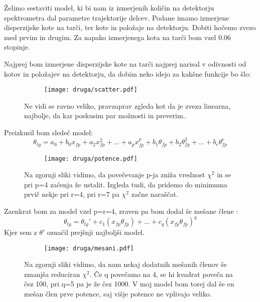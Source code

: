 \documentclass{article}
\begin{document}
Želimo sestaviti model, ki bi nam iz izmerjenih količin na detektorju spektrometra dal parametre trajektorije delcev.
Podane imamo izmerjene disperzijske kote na tarči, ter kote in položaje na detektorju. Dobiti hočemo zvezo med prvim in drugim.
Za napako izmerjenega kota na tarči bom vzel 0.06 stopinje.

Najprej bom izmerjene disperzijske kote na tarči najprej narisal v odivnosti od kotov in položajev na detektorju, da dobim neko idejo za kakšne funkcije bo šlo:

\begin{figure}[H]
\begin{subfigure}{\textwidth}
\texttt{[image: druga/scatter.pdf]}
\end{subfigure}
\caption*{Ne vidi se ravno veliko, pravzaprav zgleda kot da je zveza linearna, najbolje, da kar poskusim par možnosti in preverim..}
\end{figure}

Preizkusil bom sledeč model:
\begin{equation*}
\theta_{tg} =  a_0 + b_0 x_{fp} + a_2 x_{fp}^2 + ... + a_p x_{fp}^p + b_1 \theta_{fp} + b_2 \theta_{fp}^2 + ... + b_r \theta_{fp}^r
\end{equation*}

\begin{figure}[H]
\begin{subfigure}{\textwidth}
\texttt{[image: druga/potence.pdf]}
\end{subfigure}
\caption*{Na zgornji sliki vidimo, da povečevanje p-ja zniža vrednost $\chi^2$ in se pri p=4 začenja že ustalit. Izgleda tudi, da pridemo do minimuma prvič nekje pri r=4, pri r=7 pa $\chi^2$ začne naraščat.}
\end{figure}

Zaenkrat bom za model vzel p=r=4, zraven pa bom dodal še mešane člene :
\begin{equation*}
\theta_{tg} =  \theta_{tg}' + c_1 (x_{fp}\theta_{fp}) + ... + c_q (x_{fp} \theta_{fp})^q
\end{equation*}
Kjer sem z $\theta'$ označil prejšnji najboljši model.
\begin{figure}[H]
\begin{subfigure}{\textwidth}
\texttt{[image: druga/mesani.pdf]}
\end{subfigure}
\caption*{Na zgornji sliki vidimo, da nam nekaj dodatnih mešanih členov še zmanjša reduciran $\chi^2$. Če q povečamo na 4, se hi kvadrat poveča na čez 100, pri q=5 pa je že čez 1000. V moj model bom torej dal še en mešan člen prve potence, saj višje potence ne vplivajo veliko.}
\end{figure}
\end{document}
